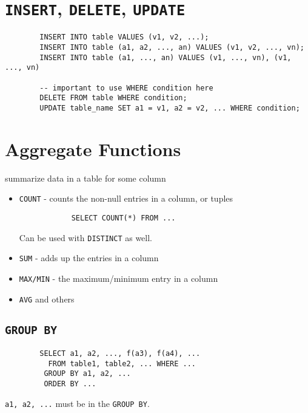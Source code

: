\documentclass{cheatsheet}
\begin{document}
\begin{multicols*}{2}
    \section{\texttt{INSERT}, \texttt{DELETE}, \texttt{UPDATE}}
    \begin{verbatim}
        INSERT INTO table VALUES (v1, v2, ...);
        INSERT INTO table (a1, a2, ..., an) VALUES (v1, v2, ..., vn);
        INSERT INTO table (a1, ..., an) VALUES (v1, ..., vn), (v1, ..., vn)

        -- important to use WHERE condition here
        DELETE FROM table WHERE condition;
        UPDATE table_name SET a1 = v1, a2 = v2, ... WHERE condition;
    \end{verbatim}

    \newpage
    \section{Aggregate Functions}
    summarize data in a table for some column
    \begin{itemize}
        \item \texttt{COUNT} - counts the non-null entries in a column, or tuples
            \begin{verbatim}
            SELECT COUNT(*) FROM ...
            \end{verbatim}

            Can be used with \texttt{DISTINCT} as well.

        \item \texttt{SUM} - adds up the entries in a column

        \item \texttt{MAX/MIN} - the maximum/minimum entry in a column

        \item \texttt{AVG} and others
    \end{itemize}

    \subsection{\texttt{GROUP BY}}
    \begin{verbatim}
        SELECT a1, a2, ..., f(a3), f(a4), ...
          FROM table1, table2, ... WHERE ...
         GROUP BY a1, a2, ...
         ORDER BY ...
    \end{verbatim}

    \texttt{a1, a2, ...} must be in the \texttt{GROUP BY}.


\end{multicols*}
\end{document}
